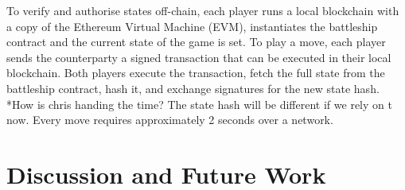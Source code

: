 \documentclass{llncs}
\newcommand{\battleshipbegin}{\mathsf{BS.begingame}}
\begin{document}
To verify and authorise states off-chain, each player runs a local blockchain with a copy of the Ethereum Virtual Machine (EVM), instantiates the battleship contract and the current state of the game is set. 
To play a move, each player sends the counterparty a signed transaction that can be executed in their local blockchain. 
Both players execute the transaction, fetch the full state from the battleship contract, hash it, and exchange signatures for the new state hash. 
*How is chris handing the time? The state hash will be different if we rely on t now. 
Every move requires approximately 2 seconds over a network. 


\section{Discussion and Future Work} 


%
%

\end{document}
